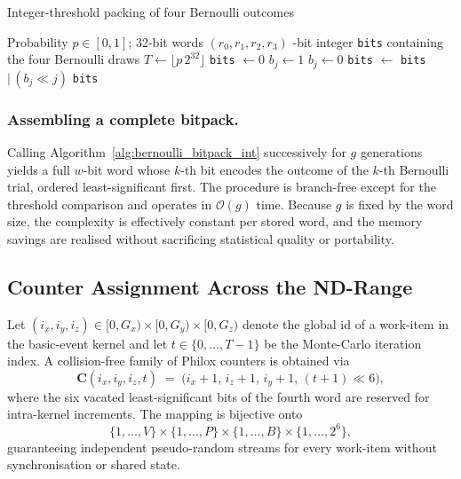 \begin{algorithm}[H]
  \caption{Integer-threshold packing of four Bernoulli outcomes}
  \label{alg:bernoulli_bitpack_int}
  \begin{algorithmic}[1]
    \Require Probability $p\in[0,1]$; 32-bit words $(r_0,r_1,r_2,r_3)$
    -bit integer \texttt{bits} containing the four Bernoulli draws
    \State $T \gets \lfloor p\,2^{32}\rfloor$ 
    \State \texttt{bits} $\gets 0$
        \State $b_j \gets 1$
      \Else
        \State $b_j \gets 0$
      \EndIf
      \State \texttt{bits} $\gets$ \texttt{bits} $\mid\, (b_j \ll j)$
    \EndFor
    \State \Return \texttt{bits}
  \end{algorithmic}
\end{algorithm}

\subsubsection{Assembling a complete bitpack.}  Calling Algorithm~\ref{alg:bernoulli_bitpack_int} successively for $g$ generations yields a full \(w\)-bit word whose $k$-th bit encodes the outcome of the $k$-th Bernoulli trial, ordered least-significant first.  The procedure is branch-free except for the threshold comparison and operates in $\mathcal{O}(g)$ time.  Because $g$ is fixed by the word size, the complexity is effectively constant per stored word, and the memory savings are realised without sacrificing statistical quality or portability.

\subsection{Counter Assignment Across the ND-Range}
\label{subsec:counter_assignment}

Let $(i_x,i_y,i_z)\in[0,G_x)\times[0,G_y)\times[0,G_z)$ denote the global id of a work-item in the basic-event kernel and let $t\in\{0,\dots,T-1\}$ be the Monte-Carlo iteration index.  A collision-free family of Philox counters is obtained via
\[
   \mathbf{C}(i_x,i_y,i_z,t)
   \;=\;
   \bigl(i_{x}+1,\, i_{z}+1,\, i_{y}+1,\, (t+1)\ll 6\bigr),
\]
where the six vacated least-significant bits of the fourth word are reserved for intra-kernel increments.  The mapping is bijective onto
\[
   \{1,\dots,V\}\times\{1,\dots,P\}\times\{1,\dots,B\}\times\{1,\dots,2^{6}\},
\]
guaranteeing independent pseudo-random streams for every work-item without synchronisation or shared state.